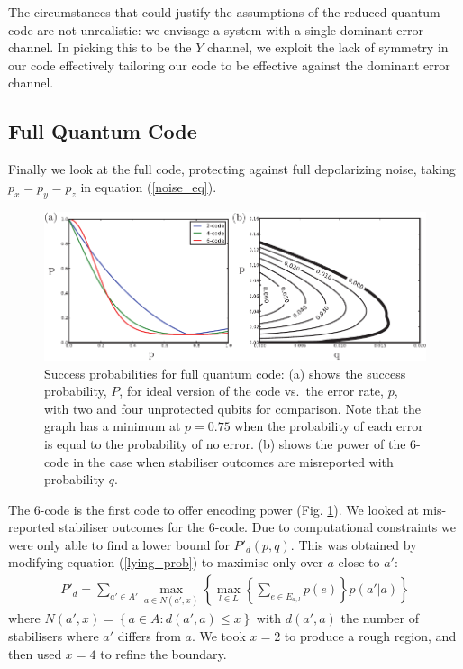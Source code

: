 The circumstances that could justify the assumptions of the reduced quantum code are not unrealistic: we envisage a system with a single dominant error channel. In picking this to be the $Y$ channel, we exploit the lack of symmetry in our code effectively tailoring our code to be effective against the dominant error channel.

\subsection{Full Quantum Code}

Finally we look at the full code, protecting against full depolarizing noise, taking $p_x = p_y = p_z$ in equation (\ref{noise_eq}). 

\begin{figure}[htb]
  \begin{center}
    \includegraphics{assets/full_results.pdf}
  \end{center}
  \caption{Success probabilities for full quantum code: (a) shows the success probability, $P$, for ideal version of the code vs.\ the error rate, $p$, with two and four unprotected qubits for comparison. Note that the graph has a minimum at $p=0.75$ when the probability of each error is equal to the probability of no error. (b) shows the power of the $6$-code in the case when stabiliser outcomes are misreported with probability $q$.}
  \label{full_results}
\end{figure}

The $6$-code is the first code to offer encoding power (Fig. \ref{full_results}). We looked at mis-reported stabiliser outcomes for the $6$-code. Due to computational constraints we were only able to find a lower bound for $P'_d(p, q)$. This was obtained by modifying equation (\ref{lying_prob}) to maximise only over $a$ close to $a'$:
\begin{align} \label{approx_eq}
  P'_d= \sum_{a'\in A'} \max_{a \in N(a',x)} \left\{ \max_{l \in L} \left\{\sum_{e \in E_{a,l}} p(e) \right\} p(a' \vert a) \right\}
\end{align}
where $N(a', x) = \left\{a \in A : d(a', a) \leq x \right\}$ with $d(a', a)$ the number of stabilisers where $a'$ differs from $a$. We took $x = 2$ to produce a rough region, and then used $x=4$ to refine the boundary. 

